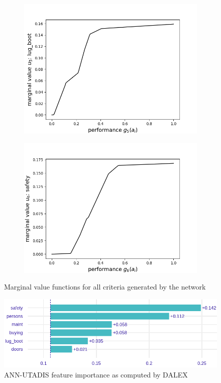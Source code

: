 \documentclass[../main.tex]{subfiles}
\begin{document}
    \begin{figure}\ContinuedFloat
    \begin{subfigure}[b]{0.48\linewidth}
        \includegraphics[width=\linewidth]{../img/marginal4.png}
    \end{subfigure}
    \begin{subfigure}[b]{0.48\linewidth}
        \includegraphics[width=\linewidth]{../img/marginal5.png}
    \end{subfigure}
    \caption{Marginal value functions for all criteria generated by the network}
\end{figure}

\begin{figure}[H]
    \centering
    \includegraphics[width=\linewidth]{../img/UTA-feature-importance.png}
    \caption{ANN-UTADIS feature importance as computed by DALEX}
    \label{fig:UTA-feats}
\end{figure}
\end{document}
